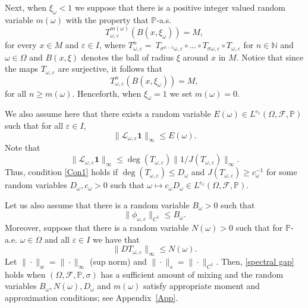 \documentclass[11pt,reqno,a4paper]{article}
\theoremstyle{special}
\renewcommand{\epsilon}{\varepsilon}
\def\N{\mathbb{N}}
\def\om{\omega}
\begin{document}

Next, when $\xi_\omega<1$ we suppose that there is a positive integer valued random variable $m(\omega)$ with the property that $\mathbb P$-a.s.
$$
T_{\omega, \varepsilon}^{m(\omega)}(B(x,\xi_\omega))=M,
$$
for every $x\in M$ and $\varepsilon \in I$,  where $T_{\om,\varepsilon}^n=\ T_{\sigma^{n-1}\om,\varepsilon}\circ\ldots\circ T_{\sigma\om,\varepsilon}\circ T_{\om,\varepsilon}$ for $n\in\N$ and $\om\in\Omega$
and $B(x,\xi)$ denotes the ball of radius $\xi$ around $x$ in $M$. Notice that since the maps  $T_{\omega, \varepsilon}$ are surjective, it follows that 
\begin{equation}\label{Cover}
T_{\omega, \varepsilon}^{n}(B(x,\xi_\omega))=M,
\end{equation}
for all $n\geq m(\omega)$. Henceforth, when $\xi_\omega=1$ we  set $m(\omega)=0$.


We also assume here that there exists a random variable $E(\omega)\in L^{e_1}(\Omega,\mathcal F,\mathbb P)$ such that for all $\varepsilon \in I$,
\begin{equation}\label{Con1}
\|\mathcal L_{\omega, \varepsilon} \textbf{1}\|_\infty\leq E(\omega). 
\end{equation}
Note that 
\begin{equation}\label{E bound}
\|\mathcal L_{\omega, \varepsilon} \textbf{1}\|_\infty\leq\deg(T_{\omega, \varepsilon})\|1/J(T_{\omega, \varepsilon})\|_\infty.    
\end{equation}
Thus, condition \eqref{Con1} holds if $\deg(T_{\omega, \varepsilon})\leq D_\omega$
and $J(T_{\omega, \varepsilon})\geq c_\omega^{-1}$ for some random variables $D_\omega,c_\omega>0$ such that $\omega\mapsto c_\omega D_\omega\in L^{e_1}(\Omega,\mathcal F,\mathbb P)$.

Let us also assume that there is a random variable $B_\omega>0$ such that 
\begin{equation}\label{B need}
\|\phi_{\omega, \varepsilon}\|_{C^1}\leq B_\omega.   
\end{equation}
 Moreover, suppose  that there is a random variable $N(\omega)>0$ such that for $\mathbb P$-a.e. $\omega \in \Omega$ and all $\epsilon \in I$ we have  that 
\begin{equation}\label{N need}
   \|DT_{\omega, \varepsilon}\|_\infty\leq N(\omega). 
\end{equation}
Let $\|\cdot\|_w=\|\cdot\|_\infty$ (sup norm) and $\|\cdot\|_{s}=\|\cdot\|_{C^1}$.
Then, \eqref{spectral gap}
holds 
when $(\Omega,\mathcal F,\mathbb P,\sigma)$ has a sufficient amount of mixing and the random variables $B_\omega, N(\omega), D_\omega$ and $m(\omega)$ satisfy appropriate moment and approximation conditions; see Appendix~\ref{App}. 
\end{document}
